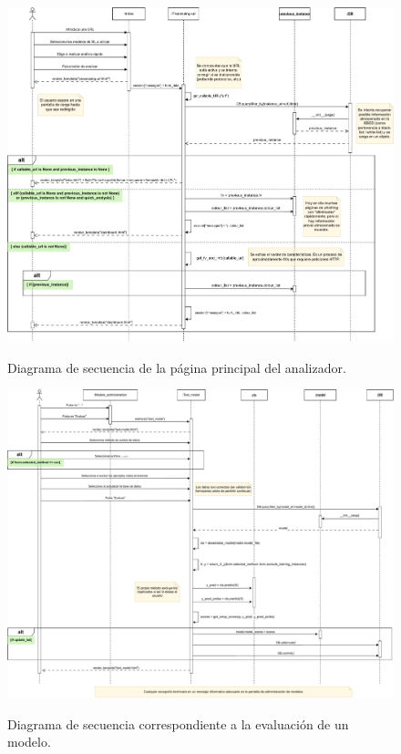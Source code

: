 	\begin{landscape}
		\begin{figure}[h]
			\caption[Diagrama: secuencia (página principal)]{Diagrama de secuencia de la página principal del analizador.}
			\centering
			\includegraphics[scale=0.45]{../img/anexos/diagrams/sequence-index}
			\label{c:diagrama-seq-index}
		\end{figure}
	\end{landscape}

	\begin{landscape}
		\begin{figure}[h]
			\caption[Diagrama: secuencia (evaluar modelo)]{Diagrama de secuencia correspondiente a la evaluación de un modelo.}
			\centering
			\includegraphics[scale=0.45]{../img/anexos/diagrams/sequence-test_model}
			\label{c:diagrama-seq-test-model}
		\end{figure}
	\end{landscape}

